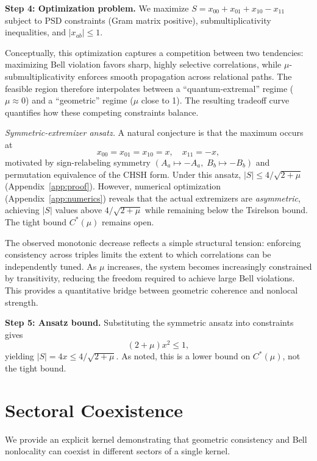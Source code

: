 \documentclass[11pt,a4paper]{article}
\theoremstyle{definition}
\theoremstyle{remark}
\begin{document}
\medskip\noindent\textbf{Step 4: Optimization problem.}\quad
We maximize $S = x_{00}+x_{01}+x_{10}-x_{11}$ subject to PSD constraints (Gram matrix positive), submultiplicativity inequalities, and $|x_{ab}| \le 1$.

Conceptually, this optimization captures a competition between two tendencies: maximizing Bell violation favors sharp, highly selective correlations, while $\mu$-submultiplicativity enforces smooth propagation across relational paths. The feasible region therefore interpolates between a ``quantum-extremal'' regime ($\mu \approx 0$) and a ``geometric'' regime ($\mu$ close to 1). The resulting tradeoff curve quantifies how these competing constraints balance.

\emph{Symmetric-extremizer ansatz.} A natural conjecture is that the maximum occurs at
\[
x_{00}=x_{01}=x_{10}=x, \quad x_{11}=-x,
\]
motivated by sign-relabeling symmetry $(A_a \mapsto -A_a,\; B_b \mapsto -B_b)$ and permutation equivalence of the CHSH form. Under this ansatz, $|S| \le 4/\sqrt{2+\mu}$ (Appendix~\ref{app:proof}). However, numerical optimization (Appendix~\ref{app:numerics}) reveals that the actual extremizers are \emph{asymmetric}, achieving $|S|$ values above $4/\sqrt{2+\mu}$ while remaining below the Tsirelson bound. The tight bound $C^*(\mu)$ remains open.

The observed monotonic decrease reflects a simple structural tension: enforcing consistency across triples limits the extent to which correlations can be independently tuned. As $\mu$ increases, the system becomes increasingly constrained by transitivity, reducing the freedom required to achieve large Bell violations. This provides a quantitative bridge between geometric coherence and nonlocal strength.

\medskip\noindent\textbf{Step 5: Ansatz bound.}\quad
Substituting the symmetric ansatz into constraints gives
\[
(2+\mu)x^2 \le 1,
\]
yielding $|S| = 4x \le 4/\sqrt{2+\mu}$. As noted, this is a lower bound on $C^*(\mu)$, not the tight bound.


\section{Sectoral Coexistence}\label{sec:coexistence}

We provide an explicit kernel demonstrating that geometric consistency and Bell nonlocality can coexist in different sectors of a single kernel.
\end{document}
